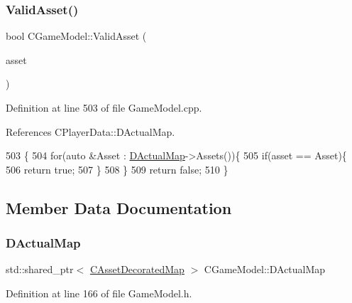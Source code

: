 \subsubsection{\texorpdfstring{Valid\+Asset()}{ValidAsset()}}
{\footnotesize\ttfamily bool C\+Game\+Model\+::\+Valid\+Asset (\begin{DoxyParamCaption}\item[{std\+::shared\+\_\+ptr$<$ \hyperlink{classCPlayerAsset}{C\+Player\+Asset} $>$}]{asset }\end{DoxyParamCaption})}



Definition at line 503 of file Game\+Model.\+cpp.



References C\+Player\+Data\+::\+D\+Actual\+Map.


\begin{DoxyCode}
503                                                               \{
504     \textcolor{keywordflow}{for}(\textcolor{keyword}{auto} &Asset : \hyperlink{classCGameModel_ace04c3b62d6b71e20d1ed5460c0c3cee}{DActualMap}->Assets())\{
505         \textcolor{keywordflow}{if}(asset == Asset)\{
506             \textcolor{keywordflow}{return} \textcolor{keyword}{true};    
507         \}
508     \}
509     \textcolor{keywordflow}{return} \textcolor{keyword}{false};
510 \}
\end{DoxyCode}


\subsection{Member Data Documentation}
\hypertarget{classCGameModel_ace04c3b62d6b71e20d1ed5460c0c3cee}{}\label{classCGameModel_ace04c3b62d6b71e20d1ed5460c0c3cee} 
\subsubsection{\texorpdfstring{D\+Actual\+Map}{DActualMap}}
{\footnotesize\ttfamily std\+::shared\+\_\+ptr$<$ \hyperlink{classCAssetDecoratedMap}{C\+Asset\+Decorated\+Map} $>$ C\+Game\+Model\+::\+D\+Actual\+Map\hspace{0.3cm}{\ttfamily [protected]}}



Definition at line 166 of file Game\+Model.\+h.

\hypertarget{classCGameModel_a2207654c461a3654c6d765dd5421373f}{}\label{classCGameModel_a2207654c461a3654c6d765dd5421373f} 
